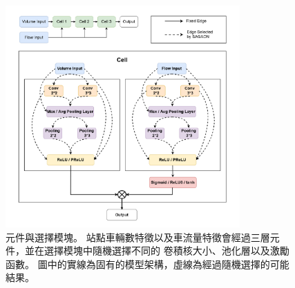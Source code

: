 \documentclass[a4paper,14pt]{extarticle}
\begin{document}
            \begin{figure}[htb]
                \centering
                \includegraphics[width=0.8\textwidth]{cell.pdf}
                \caption{
                    {\fontsize{12pt}{10pt}\selectfont
                        元件與選擇模塊。
                        站點車輛數特徵以及車流量特徵會經過三層元件，並在選擇模塊中隨機選擇不同的
                        卷積核大小、池化層以及激勵函數。
                        圖中的實線為固有的模型架構，虛線為經過隨機選擇的可能結果。
                    }
                }
                \label{fig:cell}
            \end{figure}
\end{document}
